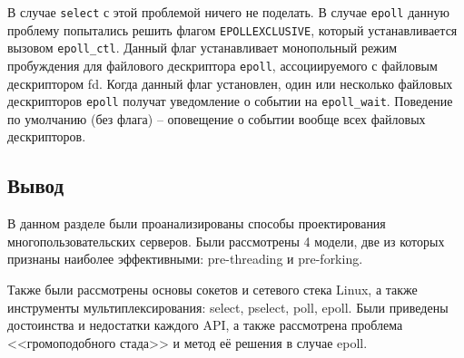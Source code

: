 В случае \texttt{select} с этой проблемой ничего не поделать. В случае \texttt{epoll} данную проблему попытались решить флагом \texttt{EPOLLEXCLUSIVE}, который устанавливается вызовом \texttt{epoll\_ctl}. Данный флаг устанавливает монопольный режим пробуждения для файлового дескриптора \texttt{epoll}, ассоциируемого с файловым дескриптором fd. Когда данный флаг установлен, один или несколько файловых дескрипторов \texttt{epoll} получат уведомление о событии на \texttt{epoll\_wait}. Поведение по умолчанию (без флага) -- оповещение о событии вообще всех файловых дескрипторов.


\subsection*{Вывод}

В данном разделе были проанализированы способы проектирования многопользовательских серверов. Были рассмотрены 4 модели, две из которых признаны наиболее эффективными: pre-threading и pre-forking. 

Также были рассмотрены основы сокетов и сетевого стека Linux, а также инструменты мультиплексирования: select, pselect, poll, epoll. Были приведены достоинства и недостатки каждого API, а также рассмотрена проблема <<громоподобного стада>> и метод её решения в случае epoll.

\pagebreak
